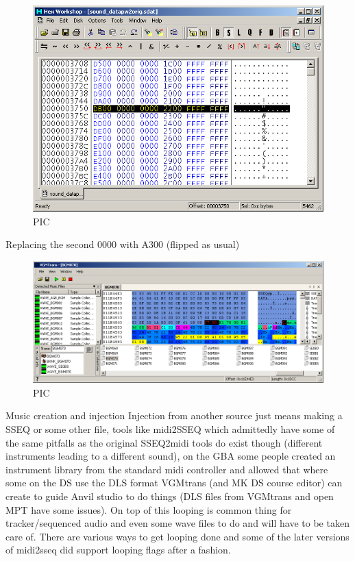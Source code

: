 \documentclass[
]{book}
\begin{document}
\begin{figure}
\centering
\includegraphics{images/150_home_fast6191_romhackingguide_unrenamed_fil___inal_borders_romhackingguidesdatinjection_7.png}
\caption{PIC}
\end{figure}

Replacing the second 0000 with A300 (flipped as usual)

\begin{figure}
\centering
\includegraphics{images/151_home_fast6191_romhackingguide_unrenamed_fil___inal_borders_romhackingguidesdatinjection_8.png}
\caption{PIC}
\end{figure}

Music creation and injection Injection from another source just means making a SSEQ or some other file, tools like midi2SSEQ which admittedly have some of the same pitfalls as the original SSEQ2midi tools do exist though (different instruments leading to a different sound), on the GBA some people created an instrument library from the standard midi controller and allowed that where some on the DS use the DLS format VGMtrans (and MK DS course editor) can create to guide Anvil studio to do things (DLS files from VGMtrans and open MPT have some issues). On top of this looping is common thing for tracker/sequenced audio and even some wave files to do and will have to be taken care of. There are various ways to get looping done and some of the later versions of midi2sseq did support looping flags after a fashion.
\end{document}
